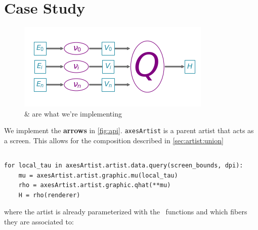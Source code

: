 \documentclass[10pt,journal,compsoc]{IEEEtran}
\theoremstyle{definition}
\theoremstyle{remark}
\begin{document}
\section{Case Study}
\label{sec:case-study}
\begin{figure}[h!]
  \includegraphics[width=\columnwidth]{path_of_q.png}
    \caption{\vchannel \& \mark are what we're implementing}
  \label{fig:api}
\end{figure}
We implement the \textbf{arrows} in \autoref{fig:api}. \texttt{axesArtist} is a parent artist that acts as a screen. This allows for the composition described in                                           \autoref{sec:artist:union}

\subsection{\vartist}
\begin{verbatim}
for local_tau in axesArtist.artist.data.query(screen_bounds, dpi):
    mu = axesArtist.artist.graphic.mu(local_tau)
    rho = axesArtist.artist.graphic.qhat(**mu)
    H = rho(renderer)
\end{verbatim}

where the artist is already parameterized with the \vindex\ functions and which fibers they are associated to:

\begin{verbatim}
\end{verbatim}


\subsubsection{\vindex}
\subsubsection{\vchannel}
\subsubsection{\vmarkd}
\end{document}
